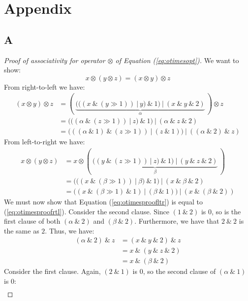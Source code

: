\section*{Appendix}

\subsection*{A}
\label{app:A}

\begin{proof}[Proof of associativity for operator $\otimes$ of Equation (\ref{eq:otimesopt})]\phantom{~}
  
  We want to show:
\begin{equation}
  \label{eq:aconc}
  x \otimes (y \otimes z) = (x \otimes y) \otimes z
\end{equation}
From right-to-left we have:
\begin{align}
  (x \otimes y) \otimes z &= (~\underbrace{(((x~\&~(y \gg 1))~|~y)~\&~1)~|~(x~\&~y~\&~2)}_{\alpha}~) \otimes z\\
              &= (((\alpha~\&~(z \gg 1))~|~z)~\&~1)~|~(\alpha~\&~z~\&~2)\\
              \label{eq:otimesproofltr}
              &= (((\alpha~\&~1)~\&~(z \gg 1))~|~(z~\&~1))~|~((\alpha~\&~2)~\&~z)
\end{align}
From left-to-right we have:
\begin{align}
  x \otimes (y \otimes z) &= x \otimes (~\underbrace{((y~\&~(z \gg 1))~|~z)~\&~1)~|~(y~\&~z~\&~2)}_{\beta}~)\\
  &= (((x~\&~(\beta \gg 1))~|~\beta)~\&~1)~|~(x~\&~\beta~\&~2)\\
  \label{eq:otimesproofrtl}
  &= ((x~\&~(\beta \gg 1)~\&~1)~|~(\beta~\&~1))~|~(x~\&~(\beta~\&~2))
\end{align}
We must now show that Equation (\ref{eq:otimesproofltr}) is equal to
(\ref{eq:otimesproofrtl}). Consider the second clause. Since $(1~\&~2)$ is $0$,
so is the first clause of both $(\alpha~\&~2)$ and $(\beta~\&~2)$. Furthermore, we have
that $2~\&~2$ is the same as $2$. Thus, we have:
\begin{align}
  (\alpha~\&~2)~\&~z &= (x~\&~y~\&~2)~\&~z\\
                &= x~\&~(y~\&~z~\&~2)\\
                &= x~\&~(\beta~\&~2)
\end{align}
Consider the first clause. Again, $(2~\&~1)$ is $0$, so the second clause of $(\alpha~\&~1)$ is $0$:
\begin{align}

\end{align}
\end{proof}
